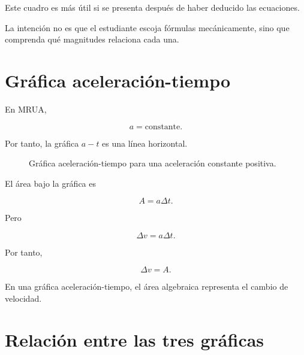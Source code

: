 \begin{notapedagogica}
Este cuadro es más útil si se presenta después de haber deducido las
ecuaciones.

La intención no es que el estudiante escoja fórmulas mecánicamente, sino que
comprenda qué magnitudes relaciona cada una.
\end{notapedagogica}


\section{Gráfica aceleración-tiempo}

En MRUA,

\[ a=\text{constante}. \]

Por tanto, la gráfica \(a-t\) es una línea horizontal.

\begin{figure}[H]
    \centering


    \caption{Gráfica aceleración-tiempo para una aceleración constante
    positiva.}
\end{figure}

El área bajo la gráfica es

\[ A=a\Delta t. \]

Pero

\[ \Delta v=a\Delta t. \]

Por tanto,

\[ \boxed{\Delta v=A}. \]

\begin{interpretacion}
En una gráfica aceleración-tiempo, el área algebraica representa el cambio
de velocidad.
\end{interpretacion}


\section{Relación entre las tres gráficas}

